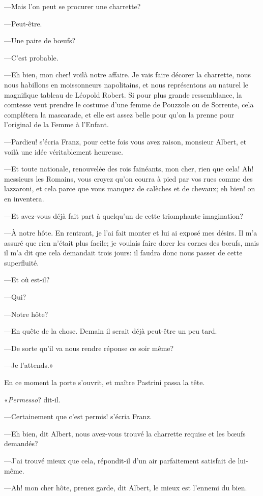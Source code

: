 —Mais l'on peut se procurer une charrette? 

—Peut-être. 

—Une paire de bœufs? 

—C'est probable. 

—Eh bien, mon cher! voilà notre affaire. Je vais faire décorer la charrette, nous nous habillons en moissonneurs napolitains, et nous représentons au naturel le magnifique tableau de Léopold Robert. Si pour plus grande ressemblance, la comtesse veut prendre le costume d'une femme de Pouzzole ou de Sorrente, cela complétera la mascarade, et elle est assez belle pour qu'on la prenne pour l'original de la Femme à l'Enfant. 

—Pardieu! s'écria Franz, pour cette fois vous avez raison, monsieur Albert, et voilà une idée véritablement heureuse. 

—Et toute nationale, renouvelée des rois fainéants, mon cher, rien que cela! Ah! messieurs les Romains, vous croyez qu'on courra à pied par vos rues comme des lazzaroni, et cela parce que vous manquez de calèches et de chevaux; eh bien! on en inventera. 

—Et avez-vous déjà fait part à quelqu'un de cette triomphante imagination?  

—À notre hôte. En rentrant, je l'ai fait monter et lui ai exposé mes désirs. Il m'a assuré que rien n'était plus facile; je voulais faire dorer les cornes des bœufs, mais il m'a dit que cela demandait trois jours: il faudra donc nous passer de cette superfluité. 

—Et où est-il? 

—Qui? 

—Notre hôte? 

—En quête de la chose. Demain il serait déjà peut-être un peu tard. 

—De sorte qu'il va nous rendre réponse ce soir même? 

—Je l'attends.» 

En ce moment la porte s'ouvrit, et maître Pastrini passa la tête. 

«\textit{Permesso}? dit-il. 

—Certainement que c'est permis! s'écria Franz. 

—Eh bien, dit Albert, nous avez-vous trouvé la charrette requise et les bœufs demandés? 

—J'ai trouvé mieux que cela, répondit-il d'un air parfaitement satisfait de lui-même. 

—Ah! mon cher hôte, prenez garde, dit Albert, le mieux est l'ennemi du bien. 

